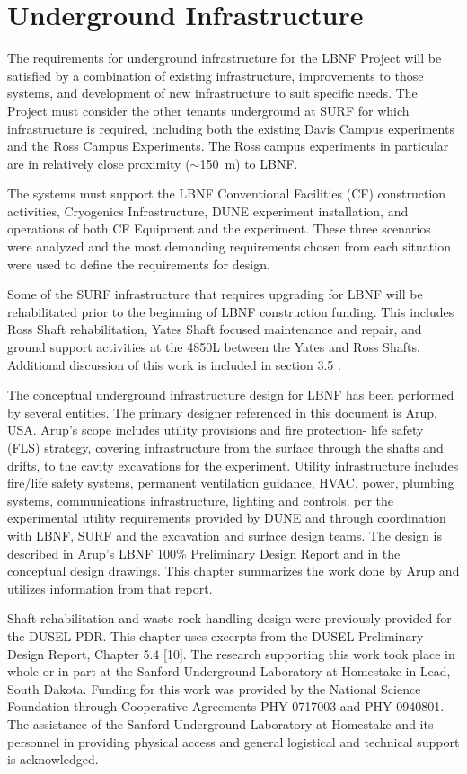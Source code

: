 \chapter{Underground Infrastructure}
\label{ch:fscf-und-infra}

The requirements for underground infrastructure for the LBNF Project will be satisfied by a combination of existing infrastructure, improvements to those systems, and development of new infrastructure to suit specific needs. The Project must consider the other tenants underground at SURF for which infrastructure is required, including both the existing Davis Campus experiments and the Ross Campus Experiments. The Ross campus experiments in particular are in relatively close proximity ($\sim$150~m) to LBNF.

The systems must support the LBNF Conventional Facilities (CF) construction activities, Cryogenics Infrastructure, DUNE experiment installation, and operations of both CF Equipment and the experiment. These three scenarios were analyzed and the most demanding requirements chosen from each situation were used to define the requirements for design.

Some of the SURF infrastructure that requires upgrading for LBNF will be rehabilitated prior to the beginning of LBNF construction funding. This includes Ross Shaft rehabilitation, Yates Shaft focused maintenance and repair, and ground support activities at the 4850L between the Yates and Ross Shafts. Additional discussion of this work is included in section 3.5 .

The conceptual underground infrastructure design for LBNF has been performed by several entities. The primary designer referenced in this document is Arup, USA. Arup's scope includes utility provisions and fire protection- life safety (FLS) strategy, covering infrastructure from the surface through the shafts and drifts, to the cavity excavations for the experiment. Utility infrastructure includes fire/life safety systems, permanent ventilation guidance, HVAC, power, plumbing systems, communications infrastructure, lighting and controls, per the experimental utility requirements provided by DUNE and through coordination with LBNF, SURF and the excavation and surface design teams. The design is described in Arup's LBNF 100\% Preliminary Design Report\cite{arup:fscf100pdr} and in the conceptual design drawings. This chapter summarizes the work done by Arup and utilizes information from that report.

Shaft rehabilitation and waste rock handling design were previously provided for the DUSEL PDR. This chapter uses excerpts from the DUSEL Preliminary Design Report, Chapter 5.4 [10]. The research supporting this work took place in whole or in part at the Sanford Underground Laboratory at Homestake in Lead, South Dakota. Funding for this work was provided by the National Science Foundation through Cooperative Agreements PHY-0717003 and PHY-0940801. The assistance of the Sanford Underground Laboratory at Homestake and its personnel in providing physical access and general logistical and technical support is acknowledged.


